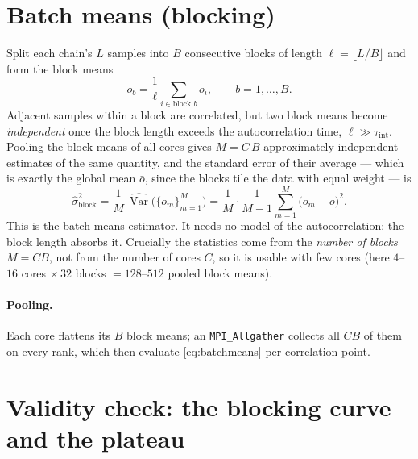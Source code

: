 \documentclass[11pt]{article}
\newcommand{\code}[1]{\texttt{#1}}
\newcommand{\Var}{\operatorname{Var}}
\newcommand{\tauint}{\tau_{\mathrm{int}}}
\begin{document}
\section{Batch means (blocking)}

Split each chain's $L$ samples into $B$ consecutive blocks of length
$\ell = \lfloor L/B\rfloor$ and form the block means
\begin{equation}
  \bar o_b = \frac1\ell \sum_{i\in \text{block }b} o_i ,
  \qquad b = 1,\dots,B .
\end{equation}
Adjacent samples within a block are correlated, but two block means become
\emph{independent} once the block length exceeds the autocorrelation time,
$\ell \gg \tauint$. Pooling the block means of all cores gives
$M = C\,B$ approximately independent estimates of the same quantity, and the
standard error of their average --- which is exactly the global mean $\bar o$,
since the blocks tile the data with equal weight --- is
\begin{equation}
  \boxed{\;
  \hat\sigma_{\mathrm{block}}^2
  = \frac1M \,\widehat{\Var}\big(\{\bar o_m\}_{m=1}^{M}\big)
  = \frac1M\cdot\frac1{M-1}\sum_{m=1}^{M}\big(\bar o_m - \bar o\big)^2 .
  \;}
  \label{eq:batchmeans}
\end{equation}
This is the batch-means estimator. It needs no model of the autocorrelation: the
block length absorbs it. Crucially the statistics come from the \emph{number of
blocks} $M=CB$, not from the number of cores $C$, so it is usable with few cores
(here $4$--$16$ cores $\times\,32$ blocks $=128$--$512$ pooled block means).

\paragraph{Pooling.} Each core flattens its $B$ block means; an
\code{MPI\_Allgather} collects all $CB$ of them on every rank, which then evaluate
\eqref{eq:batchmeans} per correlation point.

\section{Validity check: the blocking curve and the plateau}
\label{sec:plateau}
\end{document}
